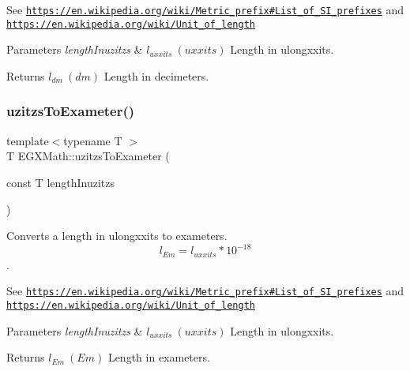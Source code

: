See \href{https://en.wikipedia.org/wiki/Metric_prefix#List_of_SI_prefixes}{\tt https\+://en.\+wikipedia.\+org/wiki/\+Metric\+\_\+prefix\#\+List\+\_\+of\+\_\+\+S\+I\+\_\+prefixes} and \href{https://en.wikipedia.org/wiki/Unit_of_length}{\tt https\+://en.\+wikipedia.\+org/wiki/\+Unit\+\_\+of\+\_\+length} 
\begin{DoxyParams}{Parameters}
{\em length\+Inuzitzs} & $ l_{uxxits}\ (uxxits)$ Length in ulongxxits. \\
\hline
\end{DoxyParams}
\begin{DoxyReturn}{Returns}
$ l_{dm}\ (dm)$ Length in decimeters. 
\end{DoxyReturn}
\mbox{\label{group___e_g_x_math-_conversions-_length_conversions-uzitzs-_s_i_ga4c102f14f5804c46db22137411ceb3be}} 
\subsubsection{\texorpdfstring{uzitzs\+To\+Exameter()}{uzitzsToExameter()}}
{\footnotesize\ttfamily template$<$typename T $>$ \\
T E\+G\+X\+Math\+::uzitzs\+To\+Exameter (\begin{DoxyParamCaption}\item[{const T}]{length\+Inuzitzs }\end{DoxyParamCaption})}



Converts a length in ulongxxits to exameters. \[ l_{Em}=l_{uxxits} * 10^{-18} \]. 

See \href{https://en.wikipedia.org/wiki/Metric_prefix#List_of_SI_prefixes}{\tt https\+://en.\+wikipedia.\+org/wiki/\+Metric\+\_\+prefix\#\+List\+\_\+of\+\_\+\+S\+I\+\_\+prefixes} and \href{https://en.wikipedia.org/wiki/Unit_of_length}{\tt https\+://en.\+wikipedia.\+org/wiki/\+Unit\+\_\+of\+\_\+length} 
\begin{DoxyParams}{Parameters}
{\em length\+Inuzitzs} & $ l_{uxxits}\ (uxxits)$ Length in ulongxxits. \\
\hline
\end{DoxyParams}
\begin{DoxyReturn}{Returns}
$ l_{Em}\ (Em)$ Length in exameters. 
\end{DoxyReturn}
\mbox{\label{group___e_g_x_math-_conversions-_length_conversions-uzitzs-_s_i_ga55b363df9781c5d92c86bcef272dfc7f}} 
